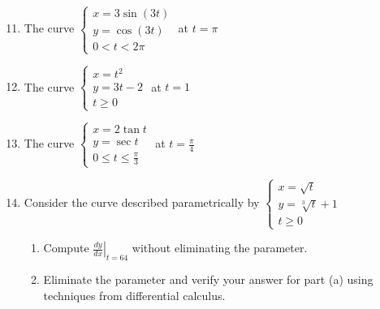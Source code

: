 \documentclass[12pt]{article}
\newif\ifans
\begin{document}
\begin{enumerate}
\setcounter{enumi}{10}

\item The curve $\left\{\begin{array}{l}
x=3\sin{(3t)}\\
y=\cos{(3t)}\\
0<t<2\pi\end{array}\right.$ at $t=\pi$ 

\ifans{\fbox{$\left.\frac{dy}{dx}\right|_{t=\pi}=0$; $\left.\frac{d^2y}{dx^2}\right|_{t=\pi}=-\frac{1}{9}$}} \fi

\item The curve $\left\{\begin{array}{l}
x=t^2\\
y=3t-2\\
t \geq 0 \end{array}\right.$ at $t=1$ 

\ifans{\fbox{$\left.\frac{dy}{dx}\right|_{t=1}=\frac{3}{2}$; $\left.\frac{d^2y}{dx^2}\right|_{t=1}=-\frac{3}{4}$}} \fi

\item The curve $\left\{\begin{array}{l}
x=2\tan{t}\\
y=\sec{t}\\
0 \leq t \leq \frac{\pi}{3} \end{array}\right.$ at $t=\frac{\pi}{4}$ 

\ifans{\fbox{$\left.\frac{dy}{dx}\right|_{t=\pi/4}=\frac{\sqrt{2}}{4}$, $\left.\frac{d^2y}{dx^2}\right|_{t=\pi/4}=\frac{\sqrt{2}}{16}$}} \fi

\item Consider the curve described parametrically by $\left\{\begin{array}{l}
x=\sqrt{t}\\
y=\sqrt[3]{t}+1\\
t \geq 0 \end{array}\right.$

\begin{enumerate}

\item Compute $\left.\frac{dy}{dx}\right|_{t=64}$ without eliminating the parameter.

\ifans{\fbox{$\left.\frac{dy}{dx}\right|_{t=64}=\frac{1}{3}$}} \fi

\item Eliminate the parameter and verify your answer for part (a) using techniques from differential calculus.


\end{enumerate}
\end{enumerate}
\end{document}
